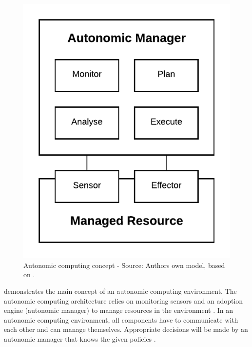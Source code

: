 \begin{figure}[h]
\centering
\includegraphics[scale=1]{images/02_theoretical_foundation/autonomic_computing/autonomic_computing_concept}
\caption{Autonomic computing concept - Source: Authors own model, based on \cite{Jacob2004AutonomicSolution}.}
\label{fig:ac_concept}
\end{figure}

 demonstrates the main concept of an autonomic computing environment. The autonomic computing architecture relies on monitoring sensors and an adoption engine (autonomic manager) to manage resources in the environment \cite{Goscinski2011CloudComputing}.
In an autonomic computing environment, all components have to communicate with each other and can manage themselves. Appropriate decisions will be made by an autonomic manager that knows the given policies \cite{Jacob2004AutonomicSolution}.

